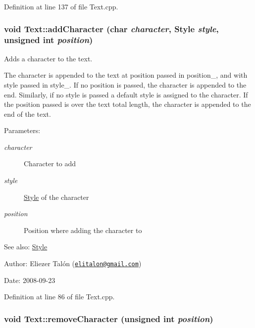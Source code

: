 Definition at line 137 of file Text.cpp.\hypertarget{class_text_a2074d216bde350970d9a4260c2d85bb}{
\subsubsection[addCharacter]{\setlength{\rightskip}{0pt plus 5cm}void Text::addCharacter (char {\em character}, \/  {\bf Style} {\em style}, \/  unsigned int {\em position})}}
\label{class_text_a2074d216bde350970d9a4260c2d85bb}


Adds a character to the text. 

The character is appended to the text at position passed in position\_\-, and with style passed in style\_\-. If no position is passed, the character is appended to the end. Similarly, if no style is passed a default style is assigned to the character. If the position passed is over the text total length, the character is appended to the end of the text.

\begin{Desc}
\item[Parameters:]
\begin{description}
\item[{\em character}]Character to add \item[{\em style}]\hyperlink{class_style}{Style} of the character \item[{\em position}]Position where adding the character to\end{description}
\end{Desc}
\begin{Desc}
\item[See also:]\hyperlink{class_style}{Style}\end{Desc}
\begin{Desc}
\item[Author:]Eliezer Talón (\href{mailto:elitalon@gmail.com}{\tt elitalon@gmail.com}) \end{Desc}
\begin{Desc}
\item[Date:]2008-09-23 \end{Desc}


Definition at line 86 of file Text.cpp.\hypertarget{class_text_d62cf2b09042cfd169b8274ef3226fbd}{
\subsubsection[removeCharacter]{\setlength{\rightskip}{0pt plus 5cm}void Text::removeCharacter (unsigned int {\em position})}}
\label{class_text_d62cf2b09042cfd169b8274ef3226fbd}


